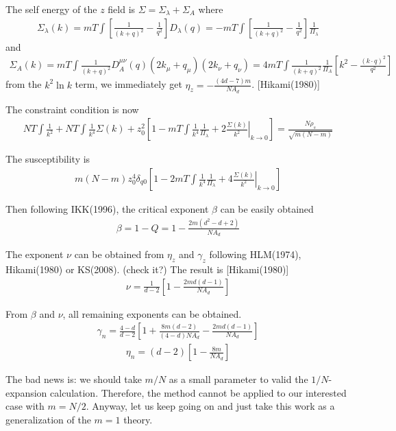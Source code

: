 \documentclass[aps,notitlepage]{revtex4-1}
\newcommand{\bea}{\begin{eqnarray}}
\newcommand{\eea}{\end{eqnarray}}
\begin{document}
The self energy of the $z$ field is $\Sigma=\Sigma_\lambda+\Sigma_A$ where
\bea \Sigma_\lambda(k)=mT\int \left[\frac{1}{(k+q)^2}-\frac{1}{q^2}\right]D_\lambda(q)=-mT\int \left[\frac{1}{(k+q)^2}-\frac{1}{q^2}\right]\frac{1}{\Pi_\lambda} \eea
and
\bea \Sigma_A(k)=mT\int \frac{1}{(k+q)^2} D_A^{\mu\nu}(q) (2k_\mu+q_\mu) (2k_\nu+q_\nu) = 4mT\int \frac{1}{(k+q)^2}\frac{1}{\Pi_A}\left[ k^2-\frac{(k\cdot q)^2}{q^2} \right] \eea 
from the $k^2\ln k$ term, we immediately get $\eta_z=-\frac{(4d-7)m}{NA_d}$. [Hikami(1980)]

The constraint condition is now
\bea NT\int \frac{1}{k^2} + NT\int \frac{1}{k^4}\Sigma(k) + z_0^2 \left[ 1-  mT\int \frac{1}{k^4} \frac{1}{\Pi_\lambda} + 2 \left.\frac{\Sigma(k)}{k^2}\right|_{k\rightarrow0}\right] = \frac{N\rho_s}{\sqrt{m(N-m)}} \eea 

The susceptibility is 
\bea m(N-m)z_0^4\delta_{q0}\left[  1-  2mT\int \frac{1}{k^4} \frac{1}{\Pi_\lambda} + 4 \left.\frac{\Sigma(k)}{k^2}\right|_{k\rightarrow0} \right] \eea

Then following IKK(1996), the critical exponent $\beta$ can be easily obtained
\bea \beta=1-Q=1-\frac{2m(d^2-d+2)}{NA_d} \eea 

The exponent $\nu$ can be obtained from $\eta_z$ and $\gamma_z$ following HLM(1974), Hikami(1980) or KS(2008). (check it?) The result is [Hikami(1980)]
\bea \nu=\frac{1}{d-2}\left[ 1-\frac{2md(d-1)}{NA_d} \right] \eea

From $\beta$ and $\nu$, all remaining exponents can be obtained.
\bea \gamma_n=\frac{4-d}{d-2}\left[ 1+\frac{8m(d-2)}{(4-d)NA_d}-\frac{2md(d-1)}{NA_d} \right] \eea
\bea \eta_n=(d-2)\left[1-\frac{8m}{NA_d}\right] \eea


{\color{red} The bad news is: we should take $m/N$ as a small parameter to valid the $1/N$-expansion calculation. Therefore, the method cannot be applied to our interested case with $m=N/2$. Anyway, let us keep going on and just take this work as a generalization of the $m=1$ theory.}
\end{document}
